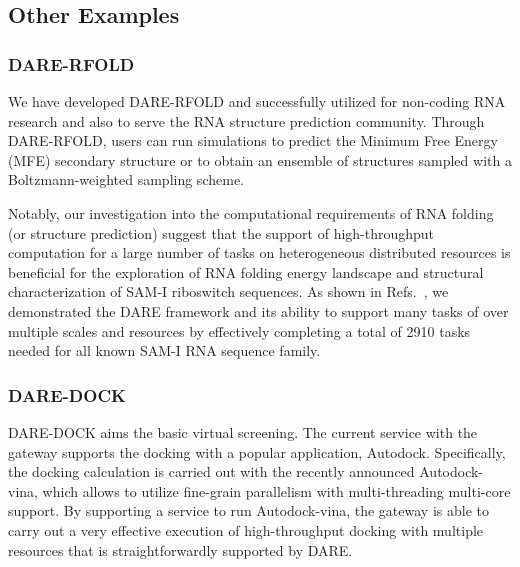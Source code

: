 \documentclass[]{svjour3}
\begin{document}
\subsection{Other Examples}
\subsubsection{DARE-RFOLD}

We have developed DARE-RFOLD and successfully utilized for non-coding RNA
research and also to serve the RNA structure prediction
community. Through DARE-RFOLD, users can run simulations to predict
the Minimum Free Energy (MFE) secondary structure or to obtain an
ensemble of structures sampled with a Boltzmann-weighted sampling
scheme.


Notably, our investigation into the computational requirements of RNA
folding (or structure prediction) suggest that the support of high-throughput
computation for a large number of tasks on heterogeneous distributed
resources is beneficial for the exploration of RNA folding energy
landscape and structural characterization of SAM-I riboswitch
sequences. As shown in Refs.~\cite{dare-ecmls11,ccpe11}, we demonstrated the DARE
framework and its ability to support many tasks of over multiple
scales and resources by effectively completing a
total of 2910 tasks needed for all known SAM-I RNA sequence family.

\subsubsection{DARE-DOCK}
DARE-DOCK aims the basic virtual screening.  The current
service with the gateway supports the docking with a popular
application, Autodock\cite{autodock}. 
Specifically, the docking calculation is carried out with the recently
announced Autodock-vina, which allows to utilize fine-grain
parallelism with multi-threading multi-core support.  By supporting a service to run Autodock-vina, the gateway is able to carry out a
very effective execution of high-throughput docking with multiple
resources that is straightforwardly supported by DARE.
\end{document}
